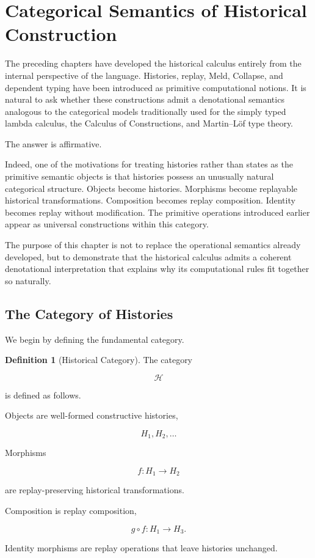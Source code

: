 \documentclass[12pt,oneside]{article}
\theoremstyle{definition}
\newtheorem{definition}[theorem]{Definition}
\theoremstyle{remark}
\begin{document}
\section{Categorical Semantics of Historical Construction}

The preceding chapters have developed the historical calculus entirely from the
internal perspective of the language. Histories, replay, Meld, Collapse, and
dependent typing have been introduced as primitive computational notions. It is
natural to ask whether these constructions admit a denotational semantics
analogous to the categorical models traditionally used for the simply typed
lambda calculus, the Calculus of Constructions, and Martin--L\"of type theory.

The answer is affirmative.

Indeed, one of the motivations for treating histories rather than states as the
primitive semantic objects is that histories possess an unusually natural
categorical structure. Objects become histories. Morphisms become replayable
historical transformations. Composition becomes replay composition. Identity
becomes replay without modification. The primitive operations introduced earlier
appear as universal constructions within this category.

The purpose of this chapter is not to replace the operational semantics already
developed, but to demonstrate that the historical calculus admits a coherent
denotational interpretation that explains why its computational rules fit
together so naturally.

\subsection{The Category of Histories}

We begin by defining the fundamental category.

\begin{definition}[Historical Category]

The category

\[
\mathcal{H}
\]

is defined as follows.

Objects are well-formed constructive histories,

\[
H_1,H_2,\ldots
\]

Morphisms

\[
f:H_1\rightarrow H_2
\]

are replay-preserving historical transformations.

Composition is replay composition,

\[
g\circ f:H_1\rightarrow H_3.
\]

Identity morphisms are replay operations that leave histories unchanged.

\end{definition}
\end{document}
